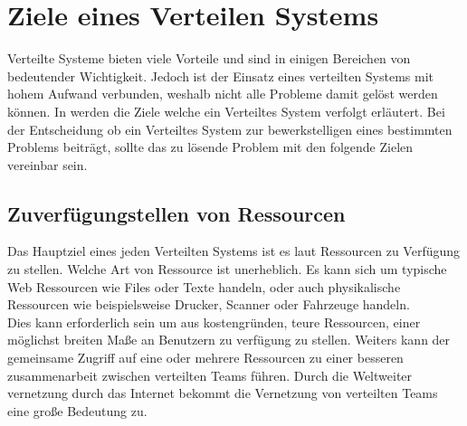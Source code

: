 \section{Ziele eines Verteilen Systems}\label{sec:distributedSystems:goales}
Verteilte Systeme bieten viele Vorteile und sind in einigen Bereichen von bedeutender Wichtigkeit. Jedoch ist der Einsatz eines verteilten Systems mit hohem Aufwand verbunden, weshalb nicht alle Probleme damit gelöst werden können. In \cite{tanenbaum2007distributed} werden die Ziele welche ein Verteiltes System verfolgt erläutert. Bei der Entscheidung ob ein Verteiltes System zur bewerkstelligen eines bestimmten Problems beiträgt, sollte das zu lösende Problem mit den folgende Zielen vereinbar sein.

\subsection{Zuverfügungstellen von Ressourcen}\label{sec:distributedSystems:goales:resourceAccess} Das Hauptziel eines jeden Verteilten Systems ist es laut \cite{tanenbaum2007distributed} Ressourcen zu Verfügung zu stellen. Welche Art von Ressource ist unerheblich. Es kann sich um typische Web Ressourcen wie Files oder Texte handeln, oder auch physikalische Ressourcen wie beispielsweise Drucker, Scanner oder Fahrzeuge handeln.\\
Dies kann erforderlich sein um aus kostengründen, teure Ressourcen, einer möglichst breiten Maße an Benutzern zu verfügung zu stellen. Weiters kann der gemeinsame Zugriff auf eine oder mehrere Ressourcen zu einer besseren zusammenarbeit zwischen verteilten Teams führen. Durch die Weltweiter vernetzung durch das Internet bekommt die Vernetzung von verteilten Teams eine große Bedeutung zu. 
